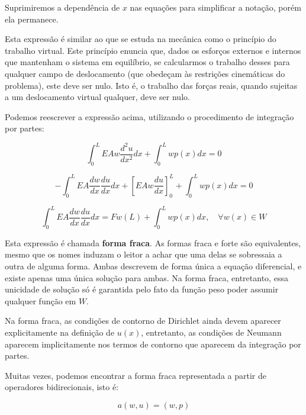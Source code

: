         Suprimiremos a dependência de $x$ nas equações para simplificar a notação, porém ela permanece.

        Esta expressão é similar ao que se estuda na mecânica como o princípio do trabalho virtual. Este princípio enuncia que, dados os esforços externos e internos que mantenham o sistema em equilíbrio, se calcularmos o trabalho desses para qualquer campo de deslocamento (que obedeçam às restrições cinemáticas do problema), este deve ser nulo. Isto é, o trabalho das forças reais, quando sujeitas a um deslocamento virtual qualquer, deve ser nulo.

        Podemos reescrever a expressão acima, utilizando o procedimento de integração por partes:


        \begin{equation}
            \int_0^L EA w \frac{d^2u}{dx^2} dx + \int_0^Lwp(x) dx = 0
        \end{equation}

        \begin{equation}
            -\int_0^L EA \frac{dw}{dx} \frac{du}{dx} dx  + \left[EA w \frac{du}{dx}\right]_0^L+ \int_0^Lwp(x) dx = 0
        \end{equation}

        \begin{equation}
            \int_0^L EA \frac{dw}{dx} \frac{du}{dx} dx  = F w(L) + \int_0^Lwp(x) dx , \quad \forall w(x) \in W
            \label{eq:forma_fraca}
        \end{equation}

        Esta expressão é chamada \textbf{forma fraca}. As formas fraca e forte são equivalentes, mesmo que os nomes induzam o leitor a achar que uma delas se sobressaia a outra de alguma forma. Ambas descrevem de forma única a equação diferencial, e existe apenas uma única solução para ambas. Na forma fraca, entretanto, essa unicidade de solução só é garantida pelo fato da função peso poder assumir qualquer função em $W$.

        Na forma fraca, as condições de contorno de Dirichlet ainda devem aparecer explicitamente na definição de $u(x)$, entretanto, as condições de Neumann aparecem implicitamente nos termos de contorno que aparecem da integração por partes.

        Muitas vezes, podemos encontrar a forma fraca representada a partir de operadores bidirecionais, isto é:

        \begin{equation}
            a(w,u)  = (w,p)
        \end{equation}

